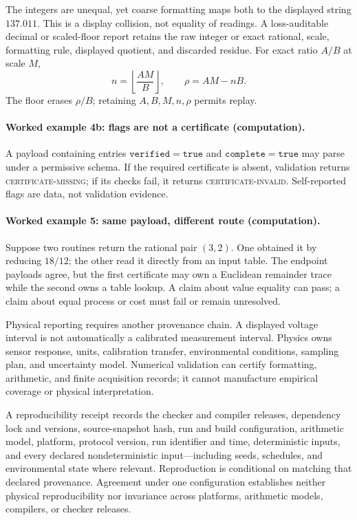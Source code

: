 The integers are unequal, yet coarse formatting maps both to the displayed string \(137.011\).  This is a display
collision, not equality of readings.  A loss-auditable decimal or scaled-floor report retains the raw integer or exact
rational, scale, formatting rule, displayed quotient, and discarded residue.  For exact ratio \(A/B\) at scale \(M\),
\[
 n=\left\lfloor\frac{AM}{B}\right\rfloor,\qquad
 \rho=AM-nB.
\]
The floor erases \(\rho/B\); retaining \(A,B,M,n,\rho\) permits replay.

\paragraph{Worked example 4b: flags are not a certificate (computation).}
A payload containing entries \(\mathtt{verified=true}\) and \(\mathtt{complete=true}\) may parse under a permissive
schema.  If the required certificate is absent, validation returns \textsc{certificate-missing}; if its checks fail, it
returns \textsc{certificate-invalid}.  Self-reported flags are data, not validation evidence.

\paragraph{Worked example 5: same payload, different route (computation).}
Suppose two routines return the rational pair \((3,2)\).  One obtained it by reducing \(18/12\); the other read it
directly from an input table.  The endpoint payloads agree, but the first certificate may own a Euclidean remainder
trace while the second owns a table lookup.  A claim about value equality can pass; a claim about equal process or cost
must fail or remain unresolved.

Physical reporting requires another provenance chain.  A displayed voltage interval is not automatically a calibrated
measurement interval.  Physics owns sensor response, units, calibration transfer, environmental conditions, sampling
plan, and uncertainty model.  Numerical validation can certify formatting, arithmetic, and finite acquisition records;
it cannot manufacture empirical coverage or physical interpretation.

A reproducibility receipt records the checker and compiler releases, dependency lock and versions, source-snapshot
hash, run and build configuration, arithmetic model, platform, protocol version, run identifier and time, deterministic
inputs, and every declared nondeterministic input---including seeds, schedules, and environmental state where relevant.
Reproduction is conditional on matching that declared provenance.  Agreement under one configuration establishes
neither physical reproducibility nor invariance across platforms, arithmetic models, compilers, or checker releases.

